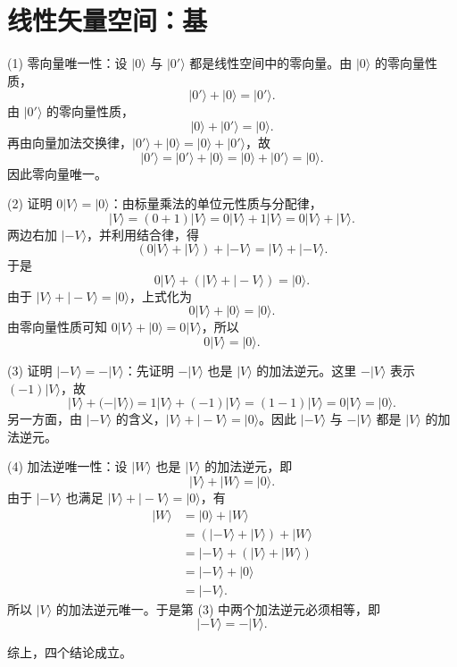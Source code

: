 ﻿%
\section{线性矢量空间：基}
\begin{solution}[零向量与加法逆的基本性质]

\answer
(1) 零向量唯一性：设 $|0\rangle$ 与 $|0'\rangle$ 都是线性空间中的零向量。由 $|0\rangle$ 的零向量性质，
\[
|0'\rangle + |0\rangle = |0'\rangle .
\]
由 $|0'\rangle$ 的零向量性质，
\[
|0\rangle + |0'\rangle = |0\rangle .
\]
再由向量加法交换律，$|0'\rangle+|0\rangle=|0\rangle+|0'\rangle$，故
\[
|0'\rangle = |0'\rangle+|0\rangle
= |0\rangle+|0'\rangle
= |0\rangle .
\]
因此零向量唯一。

(2) 证明 $0|V\rangle = |0\rangle$：由标量乘法的单位元性质与分配律，
\[
|V\rangle=(0+1)|V\rangle=0|V\rangle+1|V\rangle
=0|V\rangle+|V\rangle .
\]
两边右加 $|-V\rangle$，并利用结合律，得
\[
(0|V\rangle+|V\rangle)+|-V\rangle
=|V\rangle+|-V\rangle .
\]
于是
\[
0|V\rangle+(|V\rangle+|-V\rangle)=|0\rangle .
\]
由于 $|V\rangle+|-V\rangle=|0\rangle$，上式化为
\[
0|V\rangle+|0\rangle=|0\rangle .
\]
由零向量性质可知 $0|V\rangle+|0\rangle=0|V\rangle$，所以
\[
0|V\rangle=|0\rangle .
\]

(3) 证明 $|-V\rangle = -|V\rangle$：先证明 $-|V\rangle$ 也是 $|V\rangle$ 的加法逆元。这里 $-|V\rangle$ 表示 $(-1)|V\rangle$，故
\[
|V\rangle+(-|V\rangle)
=1|V\rangle+(-1)|V\rangle
=(1-1)|V\rangle
=0|V\rangle
=|0\rangle .
\]
另一方面，由 $|-V\rangle$ 的含义，$|V\rangle+|-V\rangle=|0\rangle$。因此 $|-V\rangle$ 与 $-|V\rangle$ 都是 $|V\rangle$ 的加法逆元。

(4) 加法逆唯一性：设 $|W\rangle$ 也是 $|V\rangle$ 的加法逆元，即
\[
|V\rangle+|W\rangle=|0\rangle .
\]
由于 $|-V\rangle$ 也满足 $|V\rangle+|-V\rangle=|0\rangle$，有
\[
\begin{aligned}
|W\rangle
&= |0\rangle+|W\rangle \\
&= (|-V\rangle+|V\rangle)+|W\rangle \\
&= |-V\rangle+(|V\rangle+|W\rangle) \\
&= |-V\rangle+|0\rangle \\
&= |-V\rangle .
\end{aligned}
\]
所以 $|V\rangle$ 的加法逆元唯一。于是第 (3) 中两个加法逆元必须相等，即
\[
|-V\rangle=-|V\rangle .
\]

综上，四个结论成立。
\end{solution}


